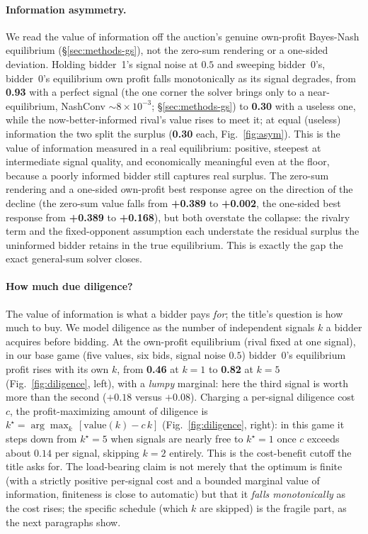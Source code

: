 \documentclass[11pt,a4paper]{article}
\begin{document}
\paragraph{Information asymmetry.} We read the value of information off the auction's
genuine own-profit Bayes-Nash equilibrium (\S\ref{sec:methods-gs}), not the zero-sum
rendering or a one-sided deviation. Holding bidder~1's signal noise at $0.5$ and
sweeping bidder~0's, bidder~0's equilibrium own profit falls monotonically as its
signal degrades, from \textbf{0.93} with a perfect signal (the one corner the solver
brings only to a near-equilibrium, NashConv $\sim$$8\times10^{-3}$; \S\ref{sec:methods-gs})
to \textbf{0.30} with a
useless one, while the now-better-informed rival's value rises to meet it; at equal
(useless) information the two split the surplus (\textbf{0.30} each, Fig.~\ref{fig:asym}).
This is the value of information measured in a real equilibrium: positive, steepest at
intermediate signal quality, and economically meaningful even at the floor, because a
poorly informed bidder still captures real surplus. The zero-sum rendering and a one-sided own-profit best response
agree on the direction of the decline (the zero-sum value falls from \textbf{+0.389}
to \textbf{+0.002}, the one-sided best response from \textbf{+0.389} to \textbf{+0.168}),
but both overstate the collapse: the rivalry term and the fixed-opponent assumption each
understate the residual surplus the uninformed bidder retains in the true equilibrium.
This is exactly the gap the exact general-sum solver closes.

\paragraph{How much due diligence?} The value of information is what a bidder pays
\emph{for}; the title's question is how much to buy. We model diligence as the number
of independent signals $k$ a bidder acquires before bidding. At the own-profit
equilibrium (rival fixed at one signal), in our base game (five values, six bids,
signal noise $0.5$) bidder~0's equilibrium profit rises with its own $k$, from
\textbf{0.46} at $k=1$ to \textbf{0.82} at $k=5$ (Fig.~\ref{fig:diligence}, left), with
a \emph{lumpy} marginal: here the third signal is worth more than the second ($+0.18$
versus $+0.08$). Charging a per-signal diligence cost $c$, the profit-maximizing amount
of diligence is $k^\star=\arg\max_k\,[\text{value}(k)-c\,k]$ (Fig.~\ref{fig:diligence},
right): in this game it steps down from $k^\star=5$ when signals are nearly free to
$k^\star=1$ once $c$ exceeds about $0.14$ per signal, skipping $k=2$ entirely. This is
the cost-benefit cutoff the title asks for. The load-bearing claim is not merely that
the optimum is finite (with a strictly positive per-signal cost and a bounded marginal
value of information, finiteness is close to automatic) but that it \emph{falls
monotonically} as the cost rises; the specific schedule (which $k$ are skipped) is the
fragile part, as the next paragraphs show.
\end{document}
